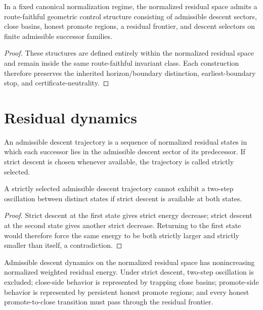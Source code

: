 \begin{theorem}\label{thm:geometric-control}
In a fixed canonical normalization regime, the normalized residual space admits a route-faithful geometric control structure consisting of admissible descent sectors, close basins, honest promote regions, a residual frontier, and descent selectors on finite admissible successor families.
\end{theorem}

\begin{proof}
These structures are defined entirely within the normalized residual space and remain inside the same route-faithful invariant class. Each construction therefore preserves the inherited horizon/boundary distinction, earliest-boundary stop, and certificate-neutrality.
\end{proof}

\section{Residual dynamics}
\begin{definition}\label{def:admissible-descent-trajectory}
An admissible descent trajectory is a sequence of normalized residual states in which each successor lies in the admissible descent sector of its predecessor. If strict descent is chosen whenever available, the trajectory is called strictly selected.
\end{definition}

\begin{lemma}\label{lem:first-no-oscillation}
A strictly selected admissible descent trajectory cannot exhibit a two-step oscillation between distinct states if strict descent is available at both states.
\end{lemma}

\begin{proof}
Strict descent at the first state gives strict energy decrease; strict descent at the second state gives another strict decrease. Returning to the first state would therefore force the same energy to be both strictly larger and strictly smaller than itself, a contradiction.
\end{proof}

\begin{theorem}\label{thm:dynamic-control}
Admissible descent dynamics on the normalized residual space has nonincreasing normalized weighted residual energy. Under strict descent, two-step oscillation is excluded; close-side behavior is represented by trapping close basins; promote-side behavior is represented by persistent honest promote regions; and every honest promote-to-close transition must pass through the residual frontier.
\end{theorem}

